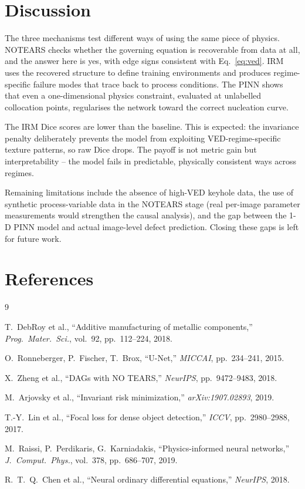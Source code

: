 \documentclass[10pt,twocolumn]{article}
\begin{document}
\section{Discussion}

The three mechanisms test different ways of using the same piece of
physics. NOTEARS checks whether the governing equation is
recoverable from data at all, and the answer here is yes, with edge
signs consistent with Eq.~\eqref{eq:ved}. IRM uses the recovered
structure to define training environments and produces
regime-specific failure modes that trace back to process conditions.
The PINN shows that even a one-dimensional physics constraint,
evaluated at unlabelled collocation points, regularises the network
toward the correct nucleation curve.

The IRM Dice scores are lower than the baseline. This is expected:
the invariance penalty deliberately prevents the model from
exploiting VED-regime-specific texture patterns, so raw Dice drops.
The payoff is not metric gain but interpretability -- the model
fails in predictable, physically consistent ways across regimes.

Remaining limitations include the absence of high-VED keyhole data,
the use of synthetic process-variable data in the NOTEARS stage
(real per-image parameter measurements would strengthen the causal
analysis), and the gap between the 1-D PINN model and actual
image-level defect prediction. Closing these gaps is left for future
work.

\section*{References}
\begingroup
\small
\renewcommand{\section}[2]{}
\begin{thebibliography}{9}

T.~DebRoy et al.,
``Additive manufacturing of metallic components,''
\textit{Prog.\ Mater.\ Sci.}, vol.~92, pp.~112--224, 2018.

O.~Ronneberger, P.~Fischer, T.~Brox,
``U-Net,''
\textit{MICCAI}, pp.~234--241, 2015.

X.~Zheng et al.,
``DAGs with NO TEARS,''
\textit{NeurIPS}, pp.~9472--9483, 2018.

M.~Arjovsky et al.,
``Invariant risk minimization,''
\textit{arXiv:1907.02893}, 2019.

T.-Y.~Lin et al.,
``Focal loss for dense object detection,''
\textit{ICCV}, pp.~2980--2988, 2017.

M.~Raissi, P.~Perdikaris, G.~Karniadakis,
``Physics-informed neural networks,''
\textit{J.\ Comput.\ Phys.}, vol.~378, pp.~686--707, 2019.

R.~T.~Q.~Chen et al.,
``Neural ordinary differential equations,''
\textit{NeurIPS}, 2018.

\end{thebibliography}
\endgroup
\end{document}
